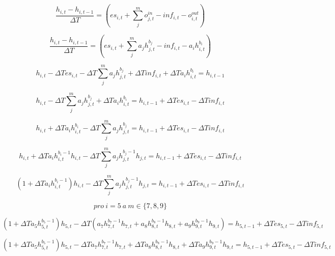 \documentclass{article}
\begin{document}
$$
  \frac{h_{i,t} - h_{i,t-1} }{\Delta T} =  \left(es_{i,t} + \sum_j^m o^{in}_{j,t} - inf_{i,t} - o^{out}_{i,t}\right)
$$


$$
  \frac{h_{i,t} - h_{i,t-1} }{\Delta T} =  \left(es_{i,t} + \sum_j^m a_jh^{b_{j}}_{j,t} - inf_{i,t} - a_ih^{b_{i}}_{i,t}\right)
$$





$$
  h_{i,t} - \Delta T es_{i,t} - \Delta T \sum_j^m a_jh^{b_{j}}_{j,t} + \Delta T inf_{i,t} + \Delta T a_ih^{b_{i}}_{i,t} = h_{i,t-1} 
$$


$$
  h_{i,t} - \Delta T \sum_j^m a_jh^{b_{j}}_{j,t} + \Delta T a_ih^{b_{i}}_{i,t} = h_{i,t-1} + \Delta T es_{i,t} - \Delta T inf_{i,t}
$$



$$
  h_{i,t} + \Delta T a_ih^{b_{i}}_{i,t} - \Delta T \sum_j^m a_jh^{b_{j}}_{j,t}  = h_{i,t-1} + \Delta T es_{i,t} - \Delta T inf_{i,t}
$$

$$
  h_{i,t} + \Delta T a_ih^{b_{i}-1}_{i,t} h_{i,t} - \Delta T \sum_j^m a_jh^{b_{j}-1}_{j,t} h_{j,t} = h_{i,t-1} + \Delta T es_{i,t} - \Delta T inf_{i,t}
$$


$$
  (1+\Delta T a_ih^{b_{i}-1}_{i,t})h_{i,t} - \Delta T \sum_j^m a_jh^{b_{j}-1}_{j,t} h_{j,t} = h_{i,t-1} + \Delta T es_{i,t} - \Delta T inf_{i,t}
$$

$$
pro\ i=5\ a\ m\in\{7,8,9\}
$$



$$
  (1+\Delta T a_5h^{b_{5}-1}_{5,t})h_{5,t} - \Delta T ( a_7h^{b_{7}-1}_{7,t} h_{7,t} + a_8h^{b_{8}-1}_{8,t} h_{8,t} + a_9 h^{b_{9}-1}_{9,t} h_{9,t} ) = h_{5,t-1} + \Delta T es_{5,t} - \Delta T inf_{5,t}
$$



$$
  (1+\Delta T a_5h^{b_{5}-1}_{5,t})h_{5,t} - \Delta T a_7h^{b_{7}-1}_{7,t} h_{7,t} + \Delta T a_8h^{b_{8}-1}_{8,t} h_{8,t} + \Delta T a_9 h^{b_{9}-1}_{9,t} h_{9,t}  = h_{5,t-1} + \Delta T es_{5,t} - \Delta T inf_{5,t}
$$
\end{document}
